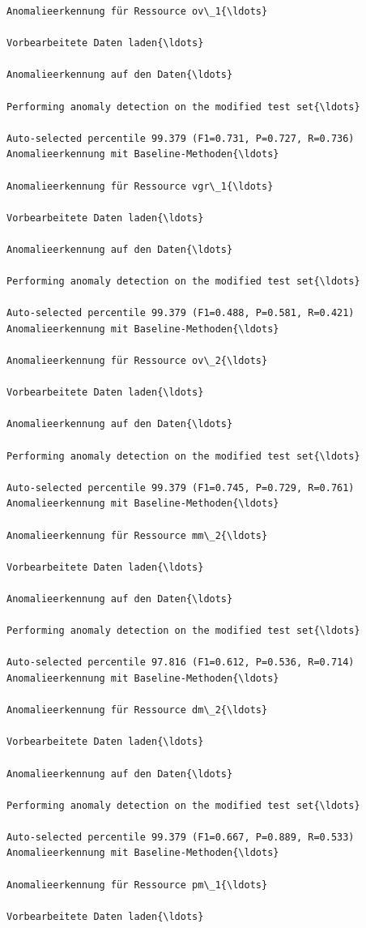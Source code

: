 \documentclass[11pt]{article}
\begin{document}
\begin{Verbatim}[commandchars=\\\{\}]
Anomalieerkennung für Ressource ov\_1{\ldots}

Vorbearbeitete Daten laden{\ldots}

Anomalieerkennung auf den Daten{\ldots}

Performing anomaly detection on the modified test set{\ldots}

Auto-selected percentile 99.379 (F1=0.731, P=0.727, R=0.736)
Anomalieerkennung mit Baseline-Methoden{\ldots}

Anomalieerkennung für Ressource vgr\_1{\ldots}

Vorbearbeitete Daten laden{\ldots}

Anomalieerkennung auf den Daten{\ldots}

Performing anomaly detection on the modified test set{\ldots}

Auto-selected percentile 99.379 (F1=0.488, P=0.581, R=0.421)
Anomalieerkennung mit Baseline-Methoden{\ldots}

Anomalieerkennung für Ressource ov\_2{\ldots}

Vorbearbeitete Daten laden{\ldots}

Anomalieerkennung auf den Daten{\ldots}

Performing anomaly detection on the modified test set{\ldots}

Auto-selected percentile 99.379 (F1=0.745, P=0.729, R=0.761)
Anomalieerkennung mit Baseline-Methoden{\ldots}

Anomalieerkennung für Ressource mm\_2{\ldots}

Vorbearbeitete Daten laden{\ldots}

Anomalieerkennung auf den Daten{\ldots}

Performing anomaly detection on the modified test set{\ldots}

Auto-selected percentile 97.816 (F1=0.612, P=0.536, R=0.714)
Anomalieerkennung mit Baseline-Methoden{\ldots}

Anomalieerkennung für Ressource dm\_2{\ldots}

Vorbearbeitete Daten laden{\ldots}

Anomalieerkennung auf den Daten{\ldots}

Performing anomaly detection on the modified test set{\ldots}

Auto-selected percentile 99.379 (F1=0.667, P=0.889, R=0.533)
Anomalieerkennung mit Baseline-Methoden{\ldots}

Anomalieerkennung für Ressource pm\_1{\ldots}

Vorbearbeitete Daten laden{\ldots}


\end{Verbatim}
\end{document}
